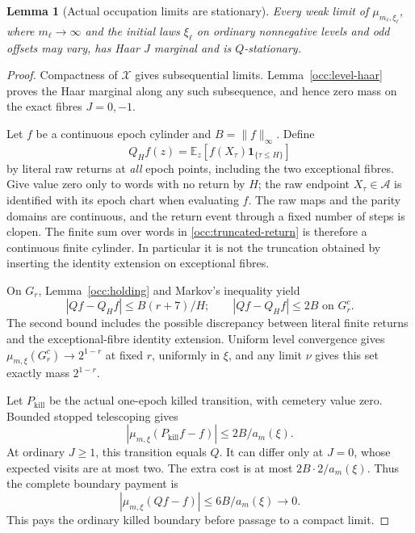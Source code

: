 \documentclass[11pt]{amsart}
\newtheorem{lemma}[theorem]{Lemma}
\theoremstyle{definition}
\theoremstyle{remark}
\newcommand{\E}{\mathbb E}
\newcommand{\one}{\mathbf 1}
\begin{document}
\begin{lemma}[Actual occupation limits are stationary]\label{occ:stationary-limit}
Every weak limit of $\mu_{m_\ell,\xi_\ell}$, where $m_\ell\to\infty$
and the initial laws $\xi_\ell$ on ordinary nonnegative levels and odd
offsets may vary, has Haar $J$ marginal and is $Q$-stationary.
\end{lemma}
\begin{proof}
Compactness of $\mathcal X$ gives subsequential limits.  Lemma~\ref{occ:level-haar}
proves the Haar marginal along any such subsequence, and hence zero mass
on the exact fibres $J=0,-1$.

Let $f$ be a continuous epoch cylinder and $B=\|f\|_\infty$.  Define
\begin{equation}
 Q_Hf(z)=\E_z[f(X_\tau)\one_{\{\tau\le H\}}]
 \label{occ:truncated-return}
\end{equation}
by literal raw returns at \emph{all} epoch points, including the two
exceptional fibres.  Give value zero only to words with no return by
$H$; the raw endpoint $X_\tau\in\mathcal A$ is identified with its epoch chart
when evaluating $f$.  The raw maps and the parity domains are continuous, and the return
event through a fixed number of steps is clopen.  The finite sum over
words in \eqref{occ:truncated-return} is therefore a continuous finite
cylinder.  In particular it is not the truncation obtained by inserting
the identity extension on exceptional fibres.

On $G_r$, Lemma~\ref{occ:holding} and Markov's inequality yield
\begin{equation}
 |Qf-Q_Hf|\le B(r+7)/H;
 \qquad |Qf-Q_Hf|\le2B\text{ on }G_r^c.
 \label{occ:return-approximation}
\end{equation}
The second bound includes the possible discrepancy between literal
finite returns and the exceptional-fibre identity extension.  Uniform
level convergence gives
$\mu_{m,\xi}(G_r^c)\to2^{1-r}$ at fixed $r$, uniformly in $\xi$,
and any limit $\nu$ gives this set exactly mass $2^{1-r}$.

Let $P_{\mathrm{kill}}$ be the actual one-epoch killed transition, with
cemetery value zero.  Bounded stopped telescoping gives
\[
 |\mu_{m,\xi}(P_{\mathrm{kill}}f-f)|\le2B/a_m(\xi).
\]
At ordinary $J\ge1$, this transition equals $Q$.  It can differ only
at $J=0$, whose expected visits are at most two.  The extra cost is at
most $2B\cdot2/a_m(\xi)$.  Thus the complete boundary payment is
\begin{equation}
 |\mu_{m,\xi}(Qf-f)|\le6B/a_m(\xi)\longrightarrow0.
 \label{occ:boundary-telescoping}
\end{equation}
This pays the ordinary killed boundary before passage to a compact limit.


\end{proof}
\end{document}
